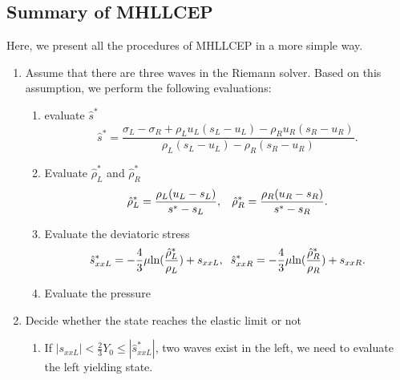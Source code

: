 \documentclass[review]{elsarticle}
\begin{document}
\subsection{Summary of MHLLCEP}
Here, we present all the procedures of MHLLCEP in a more simple way.
\begin{enumerate}
  \item  Assume  that there are three  waves in the Riemann solver. Based on this assumption, we perform the following evaluations:
  \begin{enumerate}
    \item evaluate  $\hat{s}^*$
    \begin{equation*}
       \hat{s}^* = \frac{\sigma_L-\sigma_R+\rho_L u_L(s_L-u_L)-\rho_R u_R(s_R-u_R)}{\rho_L(s_L-u_L)-\rho_R(s_R-u_R)}.
   \end{equation*}
    \item Evaluate  $\hat{\rho}_L^*$ and $\hat{\rho}_R^*$
    \begin{equation*}
       \hat{\rho}_L^* = \frac{\rho_L(u_L-s_L)}{s^*-s_L}, \hspace{0.3cm}  \hat{\rho}_R^* = \frac{\rho_R(u_R-s_R)}{s^*-s_R}.
    \end{equation*}
    \item Evaluate  the deviatoric stress
       \begin{equation*}
        \hat{s}_{xxL}^*=-\frac{4}{3}\mu\text{ln}(\frac{\hat{\rho}_L^*}{\rho_L})+s_{xxL},\hspace{0.2cm}  \hat{s}_{xxR}^*=-\frac{4}{3}\mu\text{ln}(\frac{\hat{\rho}_R^*}{\rho_R})+s_{xxR}.
      \end{equation*}
    \item Evaluate the pressure
  \end{enumerate}
  \item Decide whether the state reaches the elastic limit or not
        \begin{enumerate}
          \item If $|s_{xxL}| < \frac{2}{3}Y_0 \le |\hat{s}_{xxL}^*| $, two  waves exist in the left, we need to  evaluate the left yielding state.


\end{enumerate}
\end{enumerate}
\end{document}
